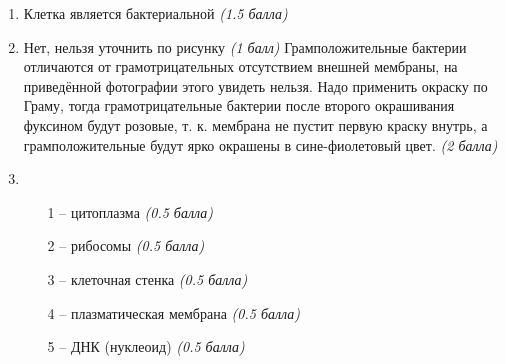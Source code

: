\solutionSection

\begin{enumerate}
\item Клетка является бактериальной \textit{(1.5 балла)}
\item Нет, нельзя уточнить по рисунку \textit{(1 балл)}
Грамположительные бактерии отличаются от грамотрицательных отсутствием внешней мембраны, на приведённой фотографии этого увидеть нельзя. Надо применить окраску по Граму, тогда грамотрицательные бактерии после второго окрашивания фуксином будут розовые, т. к. мембрана не пустит первую краску внутрь, а грамположительные будут ярко окрашены в сине-фиолетовый цвет. \textit{(2 балла)}
\item
\begin{enumerate}
\item [1 –] цитоплазма \textit{(0.5 балла)} 
\item [2 –] рибосомы \textit{(0.5 балла)}
\item [3 –] клеточная стенка \textit{(0.5 балла)}
\item [4 –] плазматическая мембрана \textit{(0.5 балла)}
\item [5 –] ДНК (нуклеоид) \textit{(0.5 балла)}
\end{enumerate}
\end{enumerate}
